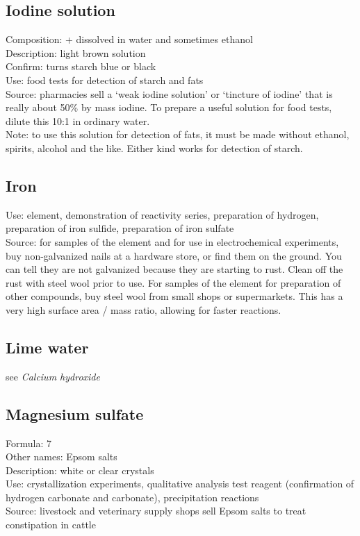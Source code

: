 \subsection*{Iodine solution}
\label{sec:iodinesol}
Composition:  +  dissolved in water and sometimes ethanol\\
Description: light brown solution\\
Confirm: turns starch blue or black\\
Use: food tests for detection of starch and fats\\
Source: pharmacies sell a ‘weak iodine solution’ 
or ‘tincture of iodine’ that is really about 50\% by mass iodine. 
To prepare a useful solution for food tests, 
dilute this 10:1 in ordinary water.\\
Note: to use this solution for detection of fats, 
it must be made without ethanol, 
spirits, 
alcohol and the like. 
Either kind works for detection of starch.
\subsection*{Iron}
\label{sec:iron}
Use: element, 
demonstration of reactivity series, 
preparation of hydrogen, 
preparation of iron sulfide, 
preparation of iron sulfate\\
Source: for samples of the element 
and for use in electrochemical experiments, 
buy non-galvanized nails at a hardware store, 
or find them on the ground. 
You can tell they are not galvanized because they are starting to rust. 
Clean off the rust with steel wool prior to use. 
For samples of the element for preparation of other compounds, 
buy steel wool from small shops or supermarkets. 
This has a very high surface area / mass ratio, 
allowing for faster reactions.

\subsection*{Lime water}
see \textit{Calcium hydroxide}

\subsection*{Magnesium sulfate}
\label{sec:magsulfate}
Formula:  7\\
Other names: Epsom salts\\
Description: white or clear crystals\\
Use: crystallization experiments, 
qualitative analysis test reagent 
(confirmation of hydrogen carbonate and carbonate), 
precipitation reactions\\
Source: livestock and veterinary supply shops sell Epsom salts 
to treat constipation in cattle
